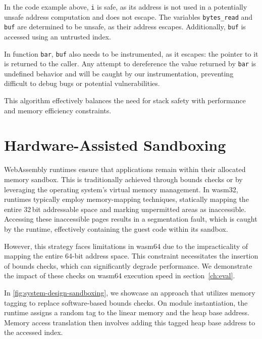 In the code example above, \texttt{i} is safe, as its address is not used in a potentially unsafe address computation and does not escape.
The variables \texttt{bytes\_read} and \texttt{buf} are determined to be unsafe, as their address escapes.
Additionally, \texttt{buf} is accessed using an untrusted index.

In function \texttt{bar}, \texttt{buf} also needs to be instrumented, as it escapes: the pointer to it is returned to the caller.
Any attempt to dereference the value returned by \texttt{bar} is undefined behavior and will be caught by our instrumentation, preventing difficult to debug bugs or potential vulnerabilities.

\noindent
This algorithm effectively balances the need for stack safety with performance and memory efficiency constraints.

\section{Hardware-Assisted Sandboxing}
\label{sec:bounds-checks}

WebAssembly runtimes ensure that applications remain within their allocated memory sandbox.
This is traditionally achieved through bounds checks or by leveraging the operating system's virtual memory management.
In wasm32, runtimes typically employ memory-mapping techniques, statically mapping the entire 32\,bit addressable space and marking unpermitted areas as inaccessible.
Accessing these inaccessible pages results in a segmentation fault, which is caught by the runtime, effectively containing the guest code within its sandbox.

However, this strategy faces limitations in wasm64 due to the impracticality of mapping the entire 64-bit address space.
This constraint necessitates the insertion of bounds checks, which can significantly degrade performance.
We demonstrate the impact of these checks on wasm64 execution speed in section~\ref{ch:eval}.

In \cref{fig:system-design-sandboxing}, we showcase an approach that utilizes memory tagging to replace software-based bounds checks.
On module instantiation, the runtime assigns a random tag to the linear memory and the heap base address.
Memory access translation then involves adding this tagged heap base address to the accessed index.

